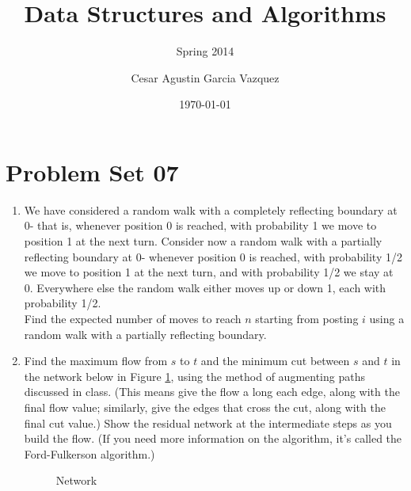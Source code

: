 \documentclass[tikz, 12pt]{scrartcl}
\title{Data Structures and Algorithms}
\subtitle{Spring 2014}
\author{Cesar Agustin Garcia Vazquez}
\date{\today}                                           %
\begin{document}
\maketitle
\section{Problem Set 07}

\begin{enumerate}
	\item We have considered a random walk with a completely reflecting boundary at 0- that is, whenever position 0 is reached, with probability 1 we move to position 1 at the next turn. Consider now a random walk with a partially reflecting boundary at 0- whenever position 0 is reached, with probability 1/2 we move to position 1 at the next turn, and with probability 1/2 we stay at 0. Everywhere else the random walk either moves up or down 1, each with probability 1/2.\\
	Find the expected number of moves to reach $n$ starting from posting $i$ using a random walk with a partially reflecting boundary.
	
	\item Find the maximum flow from $s$ to $t$ and the minimum cut between $s$ and $t$ in the network below in Figure \ref{network}, using the method of augmenting paths discussed in class. (This means give the flow a long each edge, along with the final flow value; similarly, give the edges that cross the cut, along with the final cut value.) Show the residual network at the intermediate steps as you build the flow. (If you need more information on the algorithm, it's called the Ford-Fulkerson algorithm.)
	
	
\begin{figure}[ht!]
\centering	
{}
\caption{\label{network}Network}
\end{figure}
	

\end{enumerate}
\end{document}
